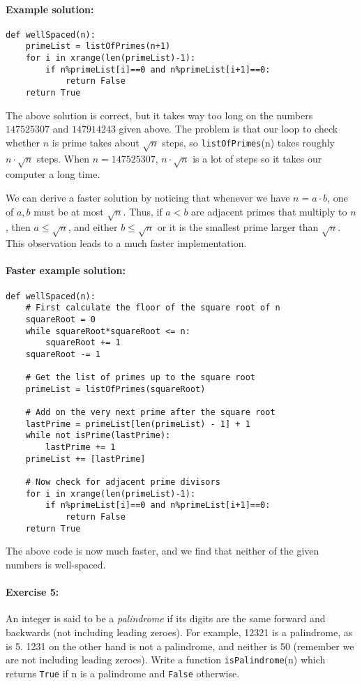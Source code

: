 \documentclass[11pt]{article}
\begin{document}
\paragraph{Example solution:}
\begin{verbatim}
def wellSpaced(n):
    primeList = listOfPrimes(n+1)
    for i in xrange(len(primeList)-1):
        if n%primeList[i]==0 and n%primeList[i+1]==0:
            return False
    return True
\end{verbatim}

The above solution is correct, but it takes way too long on the
numbers $147525307$ and $147914243$ given above.  The problem is that
our loop to check whether $n$ is prime takes about $\sqrt{n}$ steps,
so \texttt{listOfPrimes}(n) takes roughly $n\cdot \sqrt{n}$ steps.
When $n = 147525307$, $n\cdot \sqrt{n}$ is a lot of steps so it takes
our computer a long time.

We can derive a faster solution by noticing that whenever we have $n =
a\cdot b$, one of $a,b$ must be at most $\sqrt{n}$.  Thus, if $a<b$
are adjacent primes that multiply to $n$, then $a\le \sqrt{n}$, and
either $b\le \sqrt{n}$ or it is the smallest prime larger than
$\sqrt{n}$. This observation leads to a much faster implementation.

\paragraph{Faster example solution:}
\begin{verbatim}
def wellSpaced(n):
    # First calculate the floor of the square root of n
    squareRoot = 0
    while squareRoot*squareRoot <= n:
        squareRoot += 1
    squareRoot -= 1

    # Get the list of primes up to the square root
    primeList = listOfPrimes(squareRoot)

    # Add on the very next prime after the square root
    lastPrime = primeList[len(primeList) - 1] + 1
    while not isPrime(lastPrime):
        lastPrime += 1
    primeList += [lastPrime]

    # Now check for adjacent prime divisors
    for i in xrange(len(primeList)-1):
        if n%primeList[i]==0 and n%primeList[i+1]==0:
            return False
    return True
\end{verbatim}

The above code is now much faster, and we find that neither of the
given numbers is well-spaced.  

\paragraph{Exercise 5:}
An integer is said to be a {\em palindrome} if its digits are the same
forward and backwards (not including leading zeroes). For example,
12321 is a palindrome, as is 5.  1231 on the other hand is not a
palindrome, and neither is 50 (remember we are not including leading
zeroes).
Write a function \texttt{isPalindrome}(n) which returns
\texttt{True} if n is a palindrome and \texttt{False} otherwise.
\end{document}

